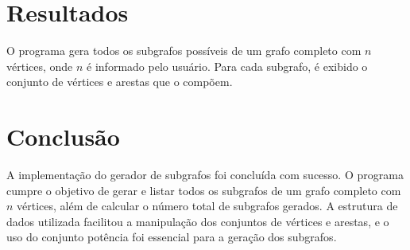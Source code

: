 \documentclass[12pt]{article}
\begin{document}
\section{Resultados}
O programa gera todos os subgrafos possíveis de um grafo completo com \(n\) vértices, onde \(n\) é informado pelo usuário. Para cada subgrafo, é exibido o conjunto de vértices e arestas que o compõem.

\section{Conclusão}
A implementação do gerador de subgrafos foi concluída com sucesso. O programa cumpre o objetivo de gerar e listar todos os subgrafos de um grafo completo com \(n\) vértices, além de calcular o número total de subgrafos gerados. A estrutura de dados utilizada facilitou a manipulação dos conjuntos de vértices e arestas, e o uso do conjunto potência foi essencial para a geração dos subgrafos.
\end{document}
